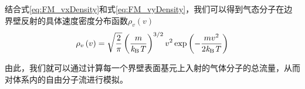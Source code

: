     结合式\ref{eq:FM_vxDensity}和式\ref{eq:FM_vyDensity}，我们可以得到气态分子在边界壁反射的具体速度密度分布函数$\rho_v\left(v\right)$\chinesecolon
    \begin{equation}
        \rho_v\left(v\right)=\sqrt{\frac{2}{\pi}} \left(\frac{m}{\it k_{\rm B} \it T}\right)^{3/ 2}v^2\exp{\left(-\frac{mv^2}{2\it k_{\rm B} \it T}\right)}
    \end{equation}

    由此，我们就可以通过计算每一个界壁表面基元上入射的气体分子的总流量，从而对体系内的自由分子流进行模拟。